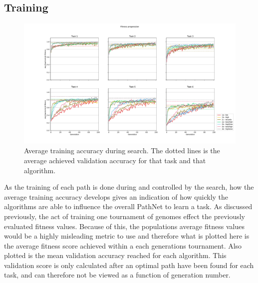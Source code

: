 \subsection{Training}
\begin{figure}[p!]%
    \includegraphics[width=1.2\textwidth,center]{Chapters/Experiments/search_algo/figures/Training_accuracy.pdf}
    \caption{Average training accuracy during search. The dotted lines is the average achieved validation accuracy for that task and that algorithm.}
    \label{fig:search.accuracy}
\end{figure}
As the training of each path is done during and controlled by the search, how the average training accuracy develops gives an indication of how quickly the algorithms are able to influence the overall PathNet to learn a task. As discussed previously, the act of training one tournament of genomes effect the previously evaluated fitness values. Because of this, the populations average fitness values would be a highly misleading metric to use and therefore what is plotted here is the average fitness score achieved within a each generations tournament. Also plotted is the mean validation accuracy reached for each algorithm. This validation score is only calculated after an optimal path have been found for each task, and can therefore not be viewed as a function of generation number. 

